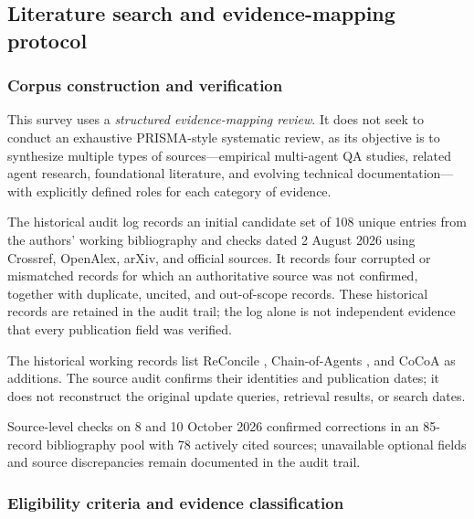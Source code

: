 \documentclass[a4paper,fleqn]{cas-dc}
\begin{document}
\subsection{Literature search and evidence-mapping protocol}
\label{sec:slr}

\subsubsection{Corpus construction and verification}
\label{sec:search}

This survey uses a \emph{structured evidence-mapping review}. It does not seek to conduct an exhaustive PRISMA-style systematic review, as its objective is to synthesize multiple types of sources—empirical multi-agent QA studies, related agent research, foundational literature, and evolving technical documentation—with explicitly defined roles for each category of evidence.

The historical audit log records an initial candidate set of 108 unique
entries from the authors' working bibliography and checks dated 2 August
2026 using Crossref, OpenAlex, arXiv, and official sources. It records four
corrupted or mismatched records for which an authoritative source was not
confirmed, together with duplicate, uncited, and out-of-scope records. These
historical records are retained in the audit trail; the log alone is not
independent evidence that every publication field was verified.

The historical working records list ReConcile
\citep{chen2024reconcile}, Chain-of-Agents \citep{zhang2024chain_agents}, and
CoCoA \citep{jiang2026cocoa} as additions. The source audit confirms their
identities and publication dates; it does not reconstruct the original update
queries, retrieval results, or search dates.

Source-level checks on 8 and 10 October 2026 confirmed corrections in an
85-record bibliography pool with 78 actively cited sources; unavailable
optional fields and source discrepancies remain documented in the audit trail.

\par\normalfont\normalsize
\subsubsection{Eligibility criteria and evidence classification}
\label{sec:screening}
\end{document}
